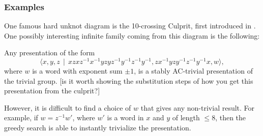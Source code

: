 \subsubsection{Examples}
One famous hard unknot diagram is the 10-crossing Culprit, first introduced in \cite{kauffman2014hardunknotscollapsingtangles}. One possibly interesting infinite family coming from this diagram is the following:
\begin{proposition}
    Any presentation of the form
    \[
\langle x,y,z \,\mid \, xzxz^{-1}x^{-1}yzyz^{-1}y^{-1}z^{-1}y^{-1}, zx^{-1}yzy^{-1}z^{-1}y^{-1}x, w \rangle,
\] where $w$ is a word with exponent sum $\pm 1$, is a stably AC-trivial presentation of the trivial group. [is it worth showing the substitution steps of how you get this presentation from the culprit?]
\end{proposition}
However, it is difficult to find a choice of $w$ that gives any non-trivial result. For example, if $w=z^{-1}w'$, where $w'$ is a word in $x$ and $y$ of length $\leq 8$, then the greedy search is able to instantly trivialize the presentation.
